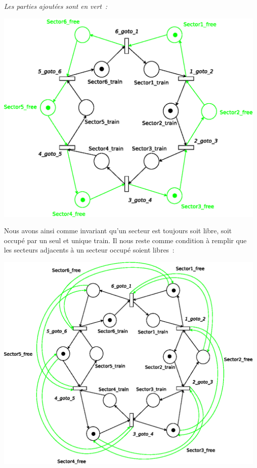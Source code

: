 \emph{Les parties ajoutées sont en vert~:}

\begin{center}
\includegraphics[height = 0.4\paperwidth]{exo8_2.eps}
\end{center}

Nous avons ainsi comme invariant qu'un secteur est toujours soit
libre, soit occupé par un seul et unique train. Il nous reste comme
condition à remplir que les secteurs adjacents à un secteur occupé
soient libres~:

\begin{center}
\includegraphics[height = 0.5\paperwidth]{exo8_3.eps}
\end{center}


